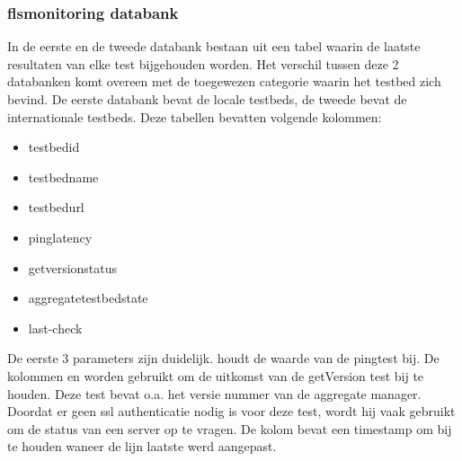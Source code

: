 \subsubsection{flsmonitoring databank}
\npar
In de eerste en de tweede databank bestaan uit een tabel waarin de laatste resultaten van elke test bijgehouden worden. Het verschil tussen deze 2 databanken komt overeen met de toegewezen categorie waarin het testbed zich bevind. De eerste databank bevat de locale testbeds, de tweede bevat de internationale testbeds. Deze tabellen bevatten volgende kolommen:
\begin{itemize}
\item testbedid
\item testbedname
\item testbedurl
\item pinglatency
\item getversionstatus
\item aggregatetestbedstate
\item last-check
\end{itemize}
 De eerste 3 parameters zijn duidelijk.  houdt de waarde van de pingtest bij.
De kolommen  en  worden gebruikt om de uitkomst van de getVersion test bij te houden. Deze test bevat o.a. het versie nummer van de aggregate manager. Doordat er geen ssl authenticatie nodig is voor deze test, wordt hij vaak gebruikt om de status van een server op te vragen. De kolom  bevat een timestamp om bij te houden waneer de lijn laatste werd aangepast.
